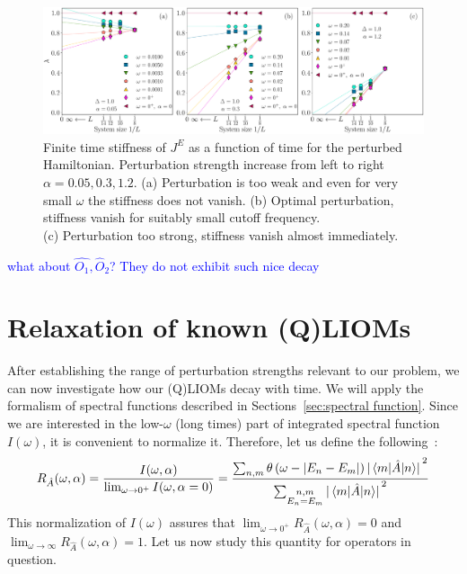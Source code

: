 \begin{figure}[htbp]
  \centering
  \includegraphics[width=\textwidth]{Figures/current_decay.pdf}
  \caption{Finite time stiffness of \(J^E\) as a function of time for the perturbed Hamiltonian.
  Perturbation strength increase from left to right \(\alpha=0.05,0.3,1.2\).
  (a) Perturbation is too weak and even for very small \(\omega\) the stiffness does
  not vanish. (b) Optimal perturbation, stiffness vanish for suitably small cutoff frequency.\\
  (c) Perturbation too strong, stiffness vanish almost immediately.}
  \label{fig:current decay}
\end{figure}


\textcolor{blue}{what about \(\hat{O_1},\hat{O}_2\)? They do not exhibit such nice decay}


\newpage

\section{Relaxation of known (Q)LIOMs}
After establishing the range of perturbation strengths relevant to our problem, we can now
investigate how our (Q)LIOMs decay with time. We will apply the formalism of spectral functions
described in Sections~\ref{sec:spectral function}.
Since we are interested in the low-\(\omega\) (long times) part of integrated spectral function
\(I(\omega)\), it is convenient to normalize it. Therefore, let us define the
following~\autocite{Mierzejewski2015Approx}:
\begin{equation}
  R_{\hat{A}}(\omega,\alpha) = \frac{I(\omega,\alpha)}{\lim_{\omega \to 0^{+}} I(\omega,\alpha=0)} = 
  \frac{\sum_{n,m}\theta\left(\omega -\abs{E_n-E_m}\right) \abs*{\matrixel{m}{\hat{A}}{n}}^2}
  {\sum_{\substack{n,m \\ E_n=E_m}} \abs*{\matrixel{m}{\hat{A}}{n}}^2}
  \label{eq:normalized integrated spectral function}
\end{equation}
This normalization of \(I(\omega)\) assures that 
\(\lim_{\omega\to 0^{+}} R_{\hat{A}}(\omega,\alpha) = 0\) and 
\(\lim_{\omega\to \infty} R_{\hat{A}}(\omega,\alpha) = 1\). Let us now study this quantity
for operators in question.


